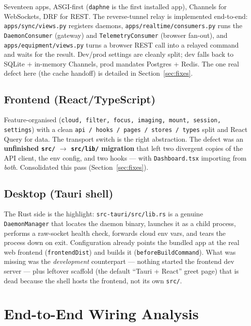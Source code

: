 \documentclass[11pt]{article}
\newcommand{\fn}[1]{\texttt{#1}}
\begin{document}
Seventeen apps, ASGI-first (\texttt{daphne} is the first installed app), Channels for WebSockets, DRF for
REST. The reverse-tunnel relay is implemented end-to-end: \fn{apps/sync/views.py} registers daemons,
\fn{apps/realtime/consumers.py} runs the \texttt{DaemonConsumer} (gateway) and \texttt{TelemetryConsumer}
(browser fan-out), and \fn{apps/equipment/views.py} turns a browser REST call into a relayed command and
waits for the result. Dev/prod settings are cleanly split; dev falls back to SQLite + in-memory Channels,
prod mandates Postgres + Redis. The one real defect here (the cache handoff) is detailed in
Section~\ref{sec:fixes}.

\subsection{Frontend (React/TypeScript)}

Feature-organised (\texttt{cloud, filter, focus, imaging, mount, session, settings}) with a clean
\texttt{api / hooks / pages / stores / types} split and React Query for data. The transport switch is the
right abstraction. The defect was an \textbf{unfinished \texttt{src/} $\rightarrow$ \texttt{src/lib/}
migration} that left two divergent copies of the API client, the env config, and two hooks --- with
\fn{Dashboard.tsx} importing from \emph{both}. Consolidated this pass (Section~\ref{sec:fixes}).

\subsection{Desktop (Tauri shell)}

The Rust side is the highlight: \fn{src-tauri/src/lib.rs} is a genuine \texttt{DaemonManager} that locates
the daemon binary, launches it as a child process, performs a raw-socket health check, forwards cloud
env vars, and tears the process down on exit. Configuration already points the bundled app at the real
web frontend (\texttt{frontendDist}) and builds it (\texttt{beforeBuildCommand}). What was missing was the
\emph{development} counterpart --- nothing started the frontend dev server --- plus leftover scaffold
(the default ``Tauri + React'' greet page) that is dead because the shell hosts the frontend, not its own
\texttt{src/}.

\section{End-to-End Wiring Analysis}
\end{document}
